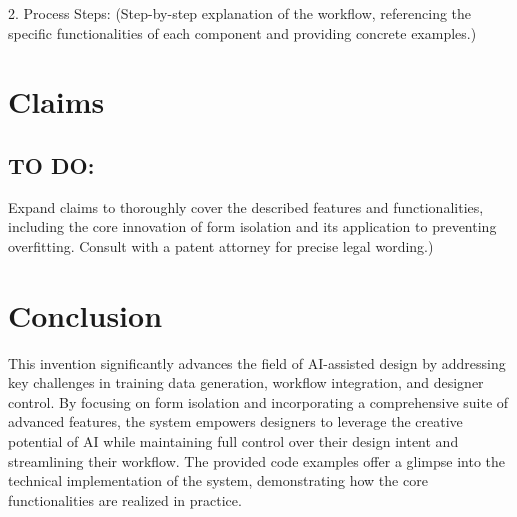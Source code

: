 \documentclass{article}
\begin{document}
2. Process Steps: (Step-by-step explanation of the workflow, referencing the specific functionalities of each component and providing concrete examples.)

\section{Claims}

\subsection{TO DO:}
Expand claims to thoroughly cover the described features and functionalities, including the core innovation of form isolation and its application to preventing overfitting. Consult with a patent attorney for precise legal wording.)

\section{Conclusion}

This invention significantly advances the field of AI-assisted design by addressing key challenges in training data generation, workflow integration, and designer control. By focusing on form isolation and incorporating a comprehensive suite of advanced features, the system empowers designers to leverage the creative potential of AI while maintaining full control over their design intent and streamlining their workflow. The provided code examples offer a glimpse into the technical implementation of the system, demonstrating how the core functionalities are realized in practice. 
\end{document}
